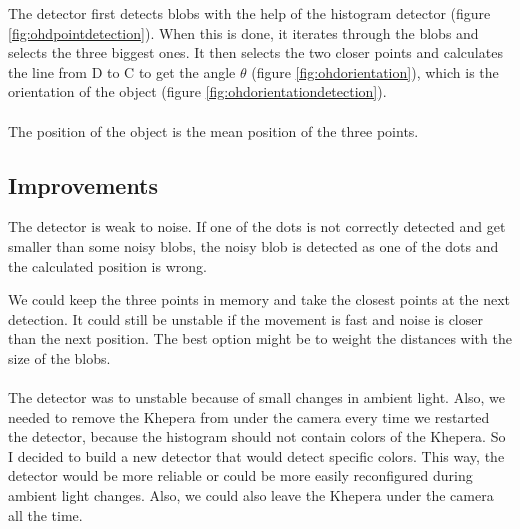     The detector first detects blobs with the help of the histogram 
    detector (figure \ref{fig:ohdpointdetection}). When this is done, it 
    iterates through the blobs and selects 
    the three biggest ones.  It then selects the two closer points and 
    calculates the line from D to C to get the angle $\theta$ (figure
    \ref{fig:ohdorientation}), which is the 
    orientation of the object (figure \ref{fig:ohdorientationdetection}).
    \\
    \\
    The position of the object is the mean position of the three points.

\subsection{Improvements}
\label{sec:ohd:improvments}

    The detector is weak to noise. If one of the dots is not correctly 
    detected and get smaller than some noisy blobs, the noisy blob is 
    detected as one of the dots and the calculated position is wrong.

    We could keep the three points in memory and take the closest points 
    at the next detection. It could still be unstable if the movement is 
    fast and noise is closer than the next position. The best option might 
    be to weight the distances with the size of the blobs. 
    \\
    \\
    The detector was to unstable because of small changes in ambient light.
    Also, we needed to remove the Khepera from under the camera every time 
    we restarted the detector, because the histogram should not contain 
    colors of the Khepera. So I decided to build a new detector that would 
    detect specific colors. This way, the detector would be more reliable 
    or could be more easily reconfigured during ambient light changes. 
    Also, we could also leave the Khepera under the camera all the time. 
    \\
    \\

